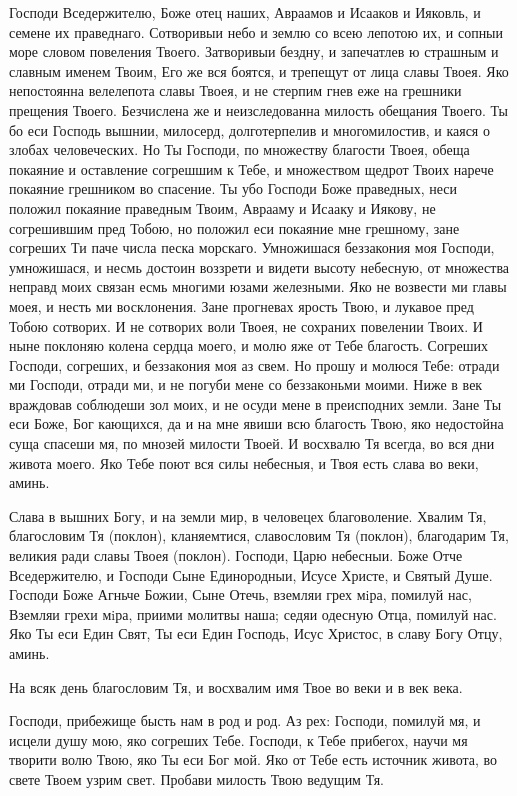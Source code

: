 Господи Вседержителю, Боже отец наших, Авраамов и Исааков и Ияковль, и семене их праведнаго. Сотворивыи небо и землю со всею лепотою их, и сопныи море словом повеления Твоего. Затворивыи бездну, и запечатлев ю страшным и славным именем Твоим, Его же вся боятся, и трепещут от лица славы Твоея. Яко непостоянна велелепота славы Твоея, и не стерпим гнев еже на грешники прещения Твоего. Безчислена же и неизследованна милость обещания Твоего. Ты бо еси Господь вышнии, милосерд, долготерпелив и многомилостив, и каяся о злобах человеческих. Но Ты Господи, по множеству благости Твоея, обеща покаяние и оставление согрешшим к Тебе, и множеством щедрот Твоих нарече покаяние грешником во спасение. Ты убо Господи Боже праведных, неси положил покаяние праведным Твоим, Аврааму и Исааку и Иякову, не согрешившим пред Тобою, но положил еси покаяние мне грешному, зане согреших Ти паче числа песка морскаго. Умножишася беззакония моя Господи, умножишася, и несмь достоин воззрети и видети высоту небесную, от множества неправд моих связан есмь многими юзами железными. Яко не возвести ми главы моея, и несть ми восклонения. Зане прогневах ярость Твою, и лукавое пред Тобою сотворих. И не сотворих воли Твоея, не сохраних повелении Твоих. И ныне поклоняю колена сердца моего, и молю яже от Тебе благость. Согреших Господи, согреших, и беззакония моя аз свем. Но прошу и молюся Тебе: отради ми Господи, отради ми, и не погуби мене со беззаконьми моими. Ниже в век враждовав соблюдеши зол моих, и не осуди мене в преисподних земли. Зане Ты еси Боже, Бог кающихся, да и на мне явиши всю благость Твою, яко недостойна суща спасеши мя, по мнозей милости Твоей. И восхвалю Тя всегда, во вся дни живота моего. Яко Тебе поют вся силы небесныя, и Твоя есть слава во веки, аминь.

Слава в вышних Богу, и на земли мир, в человецех благоволение. Хвалим Тя, благословим Тя (поклон), кланяемтися, славословим Тя (поклон), благодарим Тя, великия ради славы Твоея (поклон). Господи, Царю небесныи. Боже Отче Вседержителю, и Господи Сыне Единородныи, Исусе Христе, и Святый Душе. Господи Боже Агньче Божии, Сыне Отечь, вземляи грех мiра, помилуй нас, Вземляи грехи мiра, приими молитвы наша; седяи одесную Отца, помилуй нас. Яко Ты еси Един Свят, Ты еси Един Господь, Исус Христос, в славу Богу Отцу, аминь.

На всяк день благословим Тя, и восхвалим  имя Твое во веки и в век века.

Господи, прибежище бысть нам в род и род. Аз рех: Господи, помилуй мя, и исцели душу мою, яко согреших Тебе. Господи, к Тебе прибегох, научи мя творити волю Твою, яко Ты еси Бог мой. Яко от Тебе есть источник живота, во свете Твоем узрим свет. Пробави милость Твою ведущим Тя.

